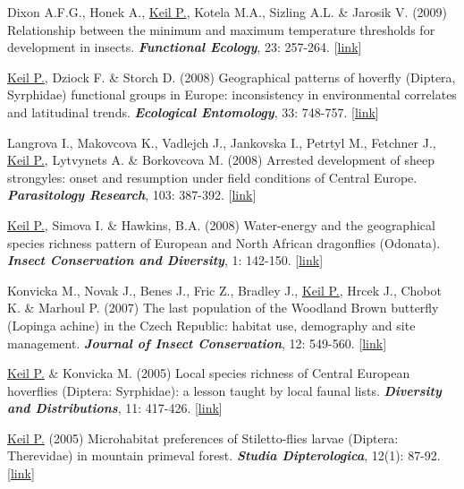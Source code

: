 \begin{etaremune}
\item Dixon A.F.G., Honek A., \underline{Keil P.}, Kotela M.A., Sizling A.L. \& Jarosik V. (2009) Relationship between the minimum and maximum temperature thresholds for development in insects. \textit{\textbf{Functional Ecology}}, 23: 257-264. [\href{http://onlinelibrary.wiley.com/doi/10.1111/j.1365-2435.2008.01489.x/abstract}{link}]

\item \underline{Keil P.}, Dziock F. \& Storch D. (2008) Geographical patterns of hoverfly (Diptera, Syrphidae) functional groups in Europe: inconsistency in environmental correlates and latitudinal trends. \textit{\textbf{Ecological Entomology}}, 33: 748-757. [\href{http://onlinelibrary.wiley.com/doi/10.1111/j.1365-2311.2008.01032.x/abstract}{link}]

\item Langrova I., Makovcova K., Vadlejch J., Jankovska I., Petrtyl M., Fetchner J., \underline{Keil P.}, Lytvynets A. \& Borkovcova M. (2008) Arrested development of sheep strongyles: onset and resumption under field conditions of Central Europe. \textit{\textbf{Parasitology Research}}, 103: 387-392. [\href{http://link.springer.com/article/10.1007%2Fs00436-008-0984-6}{link}]

\item \underline{Keil P.}, Simova I. \& Hawkins, B.A. (2008) Water-energy and the geographical species richness pattern of European and North African dragonflies (Odonata). \textit{\textbf{Insect Conservation and Diversity}}, 1: 142-150. [\href{http://onlinelibrary.wiley.com/doi/10.1111/j.1752-4598.2008.00019.x/abstract}{link}]

\item Konvicka M., Novak J., Benes J., Fric Z., Bradley J., \underline{Keil P.}, Hrcek J., Chobot K. \& Marhoul P. (2007) The last population of the Woodland Brown butterfly (Lopinga achine) in the Czech Republic: habitat use, demography and site management. \textit{\textbf{Journal of Insect Conservation}}, 12: 549-560. [\href{http://link.springer.com/article/10.1007%2Fs10841-007-9087-4}{link}]

\item \underline{Keil P.} \& Konvicka M. (2005) Local species richness of Central European hoverflies (Diptera: Syrphidae): a lesson taught by local faunal lists. \textit{\textbf{Diversity and Distributions}}, 11: 417-426. [\href{http://onlinelibrary.wiley.com/doi/10.1111/j.1366-9516.2005.00172.x/abstract}{link}]

\item \underline{Keil P.} (2005) Microhabitat preferences of Stiletto-flies larvae (Diptera: Therevidae) in mountain primeval forest. \textit{\textbf{Studia Dipterologica}}, 12(1): 87-92. [\href{http://www.studia-dipt.de/con121.htm}{link}]
\end{etaremune}

